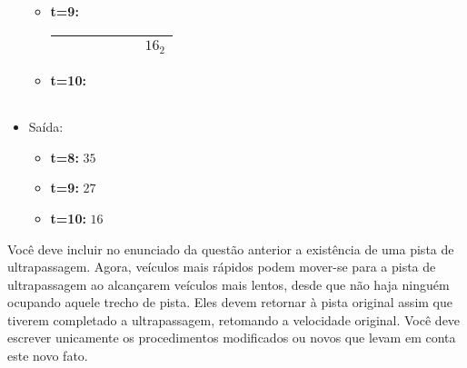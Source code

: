\begin{itemize}
\begin{itemize}
        \item \textbf{t=9:} \begin{tabular}{|p{1cm}|p{1cm}|p{1cm}|p{1cm}|p{1cm}|p{1cm}|p{1cm}|}
            \hline & & & & & & $16_2$ \\ \hline \end{tabular}
        \item \textbf{t=10:} \begin{tabular}{|p{1cm}|p{1cm}|p{1cm}|p{1cm}|p{1cm}|p{1cm}|p{1cm}|}
            \hline & & & & & & \\ \hline \end{tabular}
    \end{itemize}

    \item Saída:
    \begin{itemize}
        \item \textbf{t=8:} $35$
        \item \textbf{t=9:} $27$
        \item \textbf{t=10:} $16$
    \end{itemize}
\end{itemize}



\item Você deve incluir no enunciado da questão anterior a
existência de uma pista de ultrapassagem. Agora, veículos mais rápidos 
podem mover-se para a pista de ultrapassagem ao alcançarem veículos mais 
lentos, desde que não haja ninguém ocupando aquele trecho de pista. 
Eles devem retornar à pista original assim que tiverem completado 
a ultrapassagem, retomando a velocidade original. Você deve escrever unicamente
os procedimentos modificados ou novos que levam em conta este novo fato.

